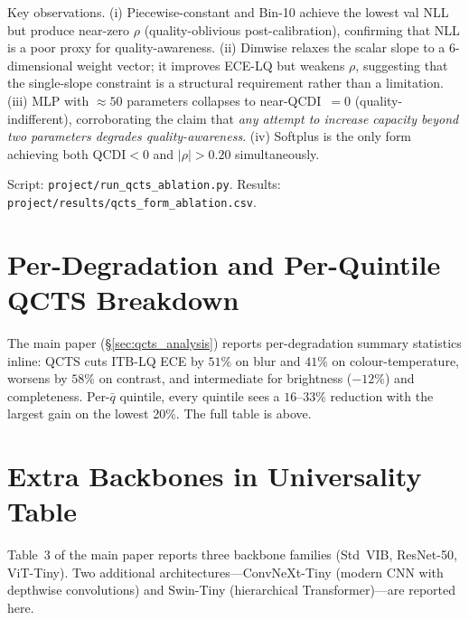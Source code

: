 \documentclass{bmvc2k}
\begin{document}
Key observations. (i) Piecewise-constant and Bin-10 achieve the lowest val NLL but produce near-zero $\rho$ (quality-oblivious post-calibration), confirming that NLL is a poor proxy for quality-awareness. (ii) Dimwise relaxes the scalar slope to a 6-dimensional weight vector; it improves ECE-LQ but weakens $\rho$, suggesting that the single-slope constraint is a structural requirement rather than a limitation. (iii) MLP with $\approx50$ parameters collapses to near-QCDI~$=0$ (quality-indifferent), corroborating the claim that \emph{any attempt to increase capacity beyond two parameters degrades quality-awareness}. (iv) Softplus is the only form achieving both QCDI${<}0$ and $|\rho|{>}0.20$ simultaneously.

Script: \texttt{project/run\_qcts\_ablation.py}.
Results: \texttt{project/results/qcts\_form\_ablation.csv}.

\section{Per-Degradation and Per-Quintile QCTS Breakdown}
\label{app:perdeg}



The main paper (\S\ref{sec:qcts_analysis}) reports per-degradation summary statistics inline: QCTS cuts ITB-LQ ECE by $51\%$ on blur and $41\%$ on colour-temperature, worsens by $58\%$ on contrast, and intermediate for brightness ($-12\%$) and completeness. Per-$\bar q$ quintile, every quintile sees a $16$--$33\%$ reduction with the largest gain on the lowest 20\%. The full table is above.

\section{Extra Backbones in Universality Table}
\label{app:extra_backbones}

Table~3 of the main paper reports three backbone families (Std~VIB, ResNet-50, ViT-Tiny). Two additional architectures---ConvNeXt-Tiny (modern CNN with depthwise convolutions) and Swin-Tiny (hierarchical Transformer)---are reported here.
\end{document}

